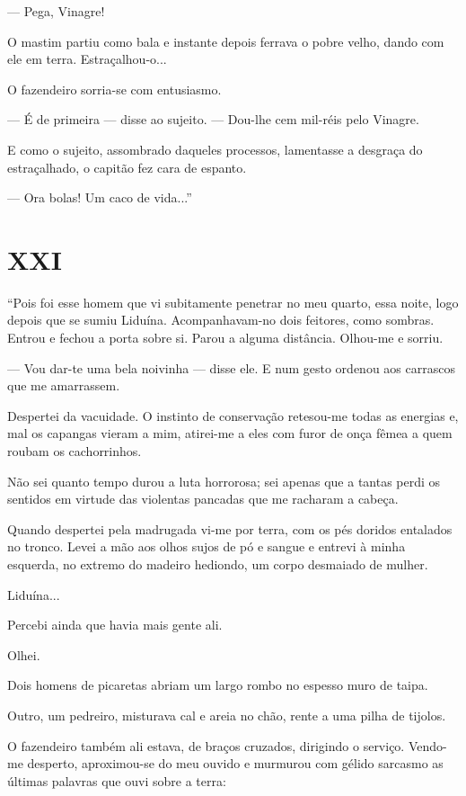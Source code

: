 --- Pega, Vinagre!

O mastim partiu como bala e instante depois ferrava o pobre velho, dando
com ele em terra. Estraçalhou-o...

O fazendeiro sorria-se com entusiasmo.

--- É de primeira --- disse ao sujeito. --- Dou-lhe cem mil-réis pelo
Vinagre.

E como o sujeito, assombrado daqueles processos, lamentasse a desgraça
do estraçalhado, o capitão fez cara de espanto.

--- Ora bolas! Um caco de vida...''

\section{XXI}

``Pois foi esse homem que vi subitamente penetrar no meu quarto, essa
noite, logo depois que se sumiu Liduína. Acompanhavam-no dois feitores,
como sombras. Entrou e fechou a porta sobre si. Parou a alguma
distância. Olhou-me e sorriu.

--- Vou dar-te uma bela noivinha --- disse ele. E num gesto ordenou aos
carrascos que me amarrassem.

Despertei da vacuidade. O instinto de conservação retesou-me todas as
energias e, mal os capangas vieram a mim, atirei-me a eles com furor de
onça fêmea a quem roubam os cachorrinhos.

Não sei quanto tempo durou a luta horrorosa; sei apenas que a tantas
perdi os sentidos em virtude das violentas pancadas que me racharam a
cabeça.

Quando despertei pela madrugada vi-me por terra, com os pés doridos
entalados no tronco. Levei a mão aos olhos sujos de pó e sangue e
entrevi à minha esquerda, no extremo do madeiro hediondo, um corpo
desmaiado de mulher.

Liduína...

Percebi ainda que havia mais gente ali.

Olhei.

Dois homens de picaretas abriam um largo rombo no espesso muro de taipa.

Outro, um pedreiro, misturava cal e areia no chão, rente a uma pilha de
tijolos.

O fazendeiro também ali estava, de braços cruzados, dirigindo o serviço.
Vendo-me desperto, aproximou-se do meu ouvido e murmurou com gélido
sarcasmo as últimas palavras que ouvi sobre a terra:

